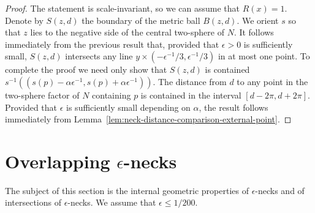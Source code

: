 \begin{proof}
The statement is scale-invariant, so we can assume that $R(x)=1$.
 Denote by $S(z,d)$ the boundary of the metric ball $B(z,d)$. We
orient $s$ so that $z$ lies to the negative side of the central
two-sphere of $N$. It follows immediately from the previous result
that, provided that $\epsilon>0$ is sufficiently small,  $S(z,d)$
intersects any line ${y}\times (-\epsilon^{-1}/3,\epsilon^{-1}/3)$
in at most one point. To complete the proof we need only show that
$S(z,d)$ is contained
$s^{-1}((s(p)-\alpha\epsilon^{-1},s(p)+\alpha\epsilon^{-1}))$. The
distance from $d$ to any point in the two-sphere factor of $N$
containing $p$ is contained in the interval $[d-2\pi,d+2\pi]$.
Provided that $\epsilon$ is sufficiently small depending on
$\alpha$, the result follows immediately from
Lemma~\ref{lem:neck-distance-comparison-external-point}.
\end{proof}






\section{Overlapping $\epsilon$-necks}

The subject of this section is the internal geometric properties of
$\epsilon$-necks and of intersections of $\epsilon$-necks. We assume that
$\epsilon\le 1/200$.


